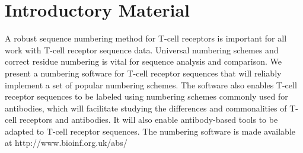 \chapter{Introductory Material}
\label{chapterlabel1}
A robust sequence numbering method for T-cell receptors is important for all work with T-cell receptor sequence data. Universal numbering schemes and correct residue numbering is vital for sequence analysis and comparison. We present a numbering software for T-cell receptor sequences that will reliably implement a set of popular numbering schemes. The software also enables T-cell receptor sequences to be labeled using numbering schemes commonly used for antibodies, which will facilitate studying the differences and commonalities of T-cell receptors and antibodies. It will also enable antibody-based tools to be adapted to T-cell receptor sequences. The numbering software is made available at http://www.bioinf.org.uk/abs/
